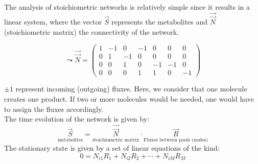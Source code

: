 The analysis of stoichiometric networks is relatively simple since it results in a linear system, where the vector $\vec{S}$ represents the metabolites and $\vec{\vec{N}}$ (stoichiometric matrix) the connectivity of the network.
\begin{figure}[H]
\begin{multicols}{2}
\begin{figure}[H]
\end{figure}\columnbreak
\begin{equation*}
\leadsto \vec{\vec{N}}=\begin{pmatrix} 1 & -1 & 0 & -1 & 0 & 0 & 0 \\ 0 & 1 & -1 & 0 & 0 & 0 & 0 \\ 0 & 0 & 1 & 0 & -1 & -1 & 0 \\ 0 & 0 & 0 & 1 & 1 & 0 & -1 \end{pmatrix}
\end{equation*}
\end{multicols}
\end{figure}
\noindent $\pm 1$ represent incoming (outgoing) fluxes. Here, we consider that one molecule creates one product. If two or more molecules would be needed, one would have to assign the fluxes accordingly.\\
The time evolution of the network is given by:
\begin{equation*}
\underset{\text{metabolites}}{\dot{\vec{S}}}=\underset{\text{stoichiometric matrix}}{\vec{\vec{N}}}\cdot\underset{\text{Fluxes between pools (nodes)}}{\vec{R}}
\end{equation*}
The stationary state is given by a set of linear equations of the kind: 
\begin{equation*}
0=N_{i1}R_1+N_{i2}R_2+\cdots +N_{iM}R_M
\end{equation*}
